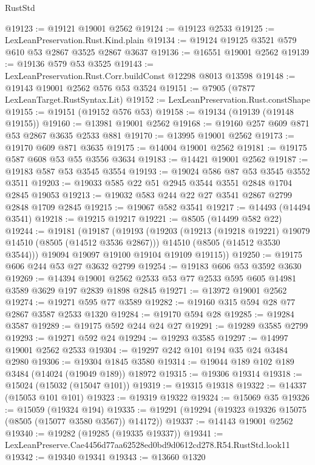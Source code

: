 \begin{lexlean}{RustStd}
\begin{coremodule}
@19123 := @19121 @19001 @2562
@19124 := @19123 @2533
@19125 := LexLeanPreservation.Rust.Kind.plain
@19134 := @19124 @19125 @3521 @579 @610 @53 @2867 @3525 @2867 @3637
@19136 := @16551 @19001 @2562
@19139 := @19136 @579 @53 @3525
@19143 := LexLeanPreservation.Rust.Corr.buildConst @12298 @8013 @13598
@19148 := @19143 @19001 @2562 @576 @53 @3524
@19151 := @7905 (@7877 LexLeanTarget.RustSyntax.Lit)
@19152 := LexLeanPreservation.Rust.constShape
@19155 := @19151 (@19152 @576 @53)
@19158 := @19134 (@19139 (@19148 @19155))
@19160 := @13981 @19001 @2562
@19168 := @19160 @257 @609 @871 @53 @2867 @3635 @2533 @881
@19170 := @13995 @19001 @2562
@19173 := @19170 @609 @871 @3635
@19175 := @14004 @19001 @2562
@19181 := @19175 @587 @608 @53 @55 @3556 @3634
@19183 := @14421 @19001 @2562
@19187 := @19183 @587 @53 @3545 @3554
@19193 := @19024 @586 @87 @53 @3545 @3552 @3511
@19203 := @19033 @585 @22 @51 @2945 @3544 @3551 @2848 @1704 @2845 @19053
@19213 := @19032 @583 @244 @22 @27 @3541 @2867 @2799 @2848 @1709 @2845
@19215 := @19067 @582 @3541
@19217 := @14493 (@14494 @3541)
@19218 := @19215 @19217
@19221 := @8505 (@14499 @582 @22)
@19244 := @19181
    (@19187
      (@19193
        (@19203
          (@19213 (@19218 @19221) @19079 @14510 (@8505 (@14512 @3536 @2867)))
          @14510
          (@8505 (@14512 @3530 @3544)))
        @19094
        @19097
        @19100
        @19104
        @19109
        @19115))
@19250 := @19175 @606 @244 @53 @27 @3632 @2799
@19254 := @19183 @606 @53 @3592 @3630
@19269 := @14394
    @19001
    @2562
    @2533
    @53
    @77
    @2533
    @595
    @605
    @14981
    @3589
    @3629
    @197
    @2839
    @1898
    @2845
@19271 := @13972 @19001 @2562
@19274 := @19271 @595 @77 @3589
@19282 := @19160 @315 @594 @28 @77 @2867 @3587 @2533 @1320
@19284 := @19170 @594 @28
@19285 := @19284 @3587
@19289 := @19175 @592 @244 @24 @27
@19291 := @19289 @3585 @2799
@19293 := @19271 @592 @24
@19294 := @19293 @3585
@19297 := @14997 @19001 @2562 @2533
@19304 := @19297 @242 @101 @194 @35 @24 @3484 @2980
@19306 := @19304 @1845 @3580
@19314 := @19044 @189 @102 @189 @3484 (@14024 (@19049 @189)) @18972
@19315 := @19306 @19314
@19318 := @15024 (@15032 (@15047 @101))
@19319 := @19315 @19318
@19322 := @14337 (@15053 @101 @101)
@19323 := @19319 @19322
@19324 := @15069 @35
@19326 := @15059 (@19324 @194)
@19335 := @19291 (@19294 (@19323 @19326 @15075 (@8505 (@15077 @3580 @3567)) @14172))
@19337 := @14143 @19001 @2562
@19340 := @19282 (@19285 (@19335 @19337))
@19341 := LexLeanPreserve.Cae4456d77aa62528ed0bd9d0612cd278.R54.RustStd.look11
@19342 := @19340 @19341
@19343 := @13660 @1320

\end{coremodule}
\end{lexlean}

